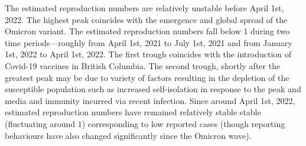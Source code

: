 The estimated reproduction numbers are relatively unstable before April 1st,
2022. The highest peak coincides with the emergence and global spread of the
Omicron variant. The estimated reproduction numbers fall below 1 during two time
periods---roughly from April 1st, 2021 to July 1st, 2021 and from January 1st,
2022 to April 1st, 2022. The first trough coincides with the introduction of
Covid-19 vaccines in British Columbia. The second trough, shortly after the
greatest peak may be due to variety of factors resulting in the depletion of the
susceptible population such as increased self-isolation in response to the peak
and media and immunity incurred via recent infection. Since around April 1st,
2022, estimated reproduction numbers have remained relatively stable stable
(fluctuating around $1$) corresponding to low reported cases (though reporting
behaviours have also changed significantly since the Omicron wave). 


